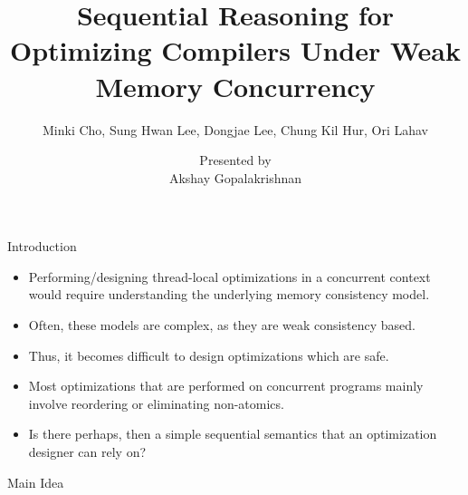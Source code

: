 \documentclass[xcolor=dvipsnames, notes]{beamer}
\title{Sequential Reasoning for Optimizing Compilers Under Weak Memory Concurrency}
\subtitle{Minki Cho, Sung Hwan Lee, Dongjae Lee, Chung Kil Hur, Ori Lahav}
\author{Presented by \\ Akshay Gopalakrishnan}
\begin{document}
    \begin{frame}
        
        \maketitle

    \end{frame}


    \begin{frame}{Introduction}
        
        \begin{itemize}
            \item Performing/designing thread-local optimizations in a concurrent context would require understanding the underlying memory consistency model.
            \item Often, these models are complex, as they are weak consistency based.
            \item Thus, it becomes difficult to design optimizations which are safe.
            \item Most optimizations that are performed on concurrent programs mainly involve reordering or eliminating non-atomics.
            \item Is there perhaps, then a simple sequential semantics that an optimization designer can rely on?
        \end{itemize}

    \end{frame}

    \begin{frame}{Main Idea}
        
    \end{frame}

    
\end{document}
